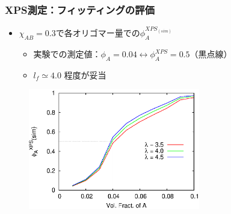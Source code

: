 \documentclass[12pt, dvipdfmx]{beamer}
\begin{document}
\begin{frame}\frametitle{XPS測定：フィッティングの評価}

\begin{itemize}
	\item $\chi_{AB} = 0.3$で各オリゴマー量での$\phi_A^{{XPS}_(sim)}$
	\begin{itemize}
		\item 実験での測定値：$\phi_A = 0.04 \leftrightarrow \phi_A^{XPS} = 0.5 $（黒点線）
		\item $l_f \simeq 4.0$ 程度が妥当
	\end{itemize}
\end{itemize}

\vspace{-0.5\baselineskip}
\begin{figure}[htbp]
	\begin{center}
		\includegraphics[width=75mm]{XPS_Chi_sin_03.eps}
	\end{center}
\end{figure}


\end{frame}
\end{document}
